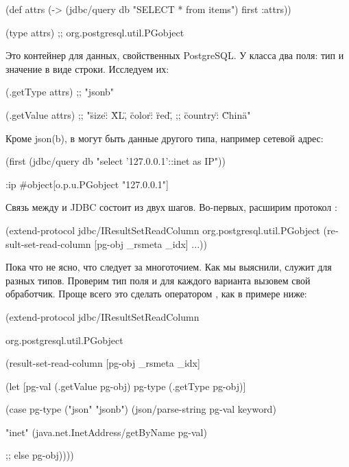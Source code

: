 \begin{english}
  \begin{clojure}
(def attrs
  (-> (jdbc/query db "SELECT * from items")
      first
      :attrs))

(type attrs)
;; org.postgresql.util.PGobject
  \end{clojure}
\end{english}

Это контейнер для данных, свойственных PostgreSQL. У класса два поля: тип и значение в виде строки. Исследуем их:

\begin{english}
  \begin{clojure}
(.getType attrs)
;; "jsonb"

(.getValue attrs)
;; "{\"size\": \"XL\", \"color\": \"red\",
;;   \"country\": \"China\"}"
  \end{clojure}
\end{english}

Кроме json(b), в  могут быть данные другого типа, например сетевой адрес:

\begin{english}
  \begin{clojure}
(first (jdbc/query db "select '127.0.0.1'::inet as IP"))

{:ip #object[o.p.u.PGobject "127.0.0.1"]}
  \end{clojure}
\end{english}

Связь между  и JDBC состоит из двух шагов. Во-первых, расширим протокол :

\begin{english}
  \begin{clojure}
(extend-protocol jdbc/IResultSetReadColumn
  org.postgresql.util.PGobject
  (result-set-read-column [pg-obj _rsmeta _idx]
    ...))
  \end{clojure}
\end{english}

Пока что не ясно, что следует за многоточием. Как мы выяснили,  служит для разных типов. Проверим тип поля и для каждого варианта вызовем свой обработчик. Проще всего это сделать оператором , как в примере ниже:

\begin{english}
  \begin{clojure/lines}
(extend-protocol jdbc/IResultSetReadColumn

  org.postgresql.util.PGobject

  (result-set-read-column
    [pg-obj _rsmeta _idx]

    (let [pg-val (.getValue pg-obj)
          pg-type (.getType pg-obj)]

      (case pg-type
        ("json" "jsonb")
        (json/parse-string pg-val keyword)

        "inet"
        (java.net.InetAddress/getByName pg-val)

        ;; else
        pg-obj))))
  \end{clojure/lines}
\end{english}

